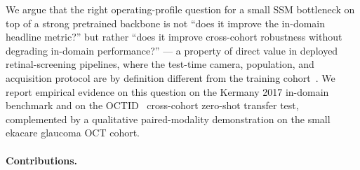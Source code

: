 \documentclass[5p]{elsarticle}
\begin{document}
We argue that the right operating-profile question for a small SSM bottleneck on top of a strong pretrained backbone is not ``does it improve the in-domain headline metric?'' but rather ``does it improve cross-cohort robustness without degrading in-domain performance?'' --- a property of direct value in deployed retinal-screening pipelines, where the test-time camera, population, and acquisition protocol are by definition different from the training cohort~\citep{wang2020domain}. We report empirical evidence on this question on the Kermany 2017 in-domain benchmark and on the OCTID~\citep{gholami2020octid} cross-cohort zero-shot transfer test, complemented by a qualitative paired-modality demonstration on the small ekacare glaucoma OCT cohort.

\paragraph{Contributions.}
\end{document}
